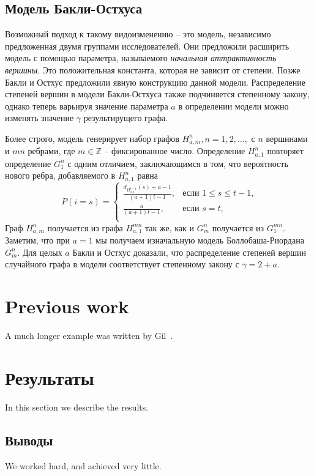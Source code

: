 \documentclass[14pt]{extreport}
\begin{document}
\section{Модель Бакли-Остхуса}
Возможный подход к такому видоизменению  -- это модель, независимо предложенная двумя группами исследователей. Они предложили расширить модель с помощью параметра, называемого {\it начальная аттрактивность вершины}. Это положительная константа, которая не зависит от степени. Позже Бакли и Остхус предложили явную конструкцию данной модели. Распределение степеней вершин в модели Бакли-Остхуса также подчиняется степенному закону, однако теперь варьируя значение параметра $a$ в определении модели можно изменять значение $\gamma$ результирущего графа.

Более строго, модель генерирует набор графов $H_{a, m}^n, n=1, 2,\dots,$ с $n$ вершинами и $mn$ ребрами, где $m \in \mathbb{Z}$ -- фиксированное число. Определение $H_{a, 1}^n$ повторяет определение $G_1^n$ с одним отличием, заключающимся в том, что вероятность нового ребра, добавляемого в $H_{a, 1}^n$ равна
$$  
P(i=s) =
\begin{cases}  
  \frac{d_{H_{a, 1}^{t-1}}(s)+a-1}{(a+1)t-1},&\text{если $1 \le s \le t-1$,}\\
  \frac{a}{(a+1)t-1},&\text{если $s=t$,}\\
\end{cases}
$$  
Граф $H_{a, m}^n$ получается из графа $H_{a, 1}^{mn}$ так же, как и $G_m^n$ получается из $G_1^{mn}$. Заметим, что при $a=1$ мы получаем изначальную модель Боллобаша-Риордана $G_m^n$. Для целых $a$ Бакли и Остхус доказали, что распределение степеней вершин случайного графа в модели соответствует степенному закону с $\gamma = 2 + a$.
 
\chapter{Previous work}
A much longer \LaTeXe{} example was written by Gil~\cite{Gil:02}.

\chapter{Результаты}
In this section we describe the results.

\section{Выводы}
We worked hard, and achieved very little.
\end{document}
